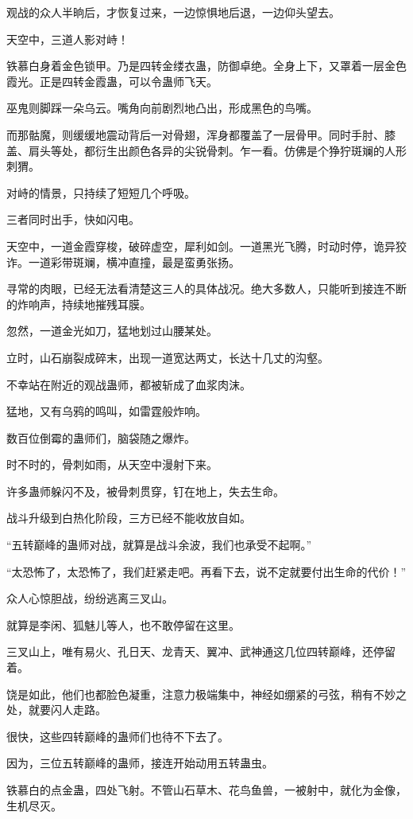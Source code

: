 \begin{this_body}
观战的众人半晌后，才恢复过来，一边惊惧地后退，一边仰头望去。

天空中，三道人影对峙！

铁慕白身着金色锁甲。乃是四转金缕衣蛊，防御卓绝。全身上下，又罩着一层金色霞光。正是四转金霞蛊，可以令蛊师飞天。

巫鬼则脚踩一朵乌云。嘴角向前剧烈地凸出，形成黑色的鸟嘴。

而那骷魔，则缓缓地震动背后一对骨翅，浑身都覆盖了一层骨甲。同时手肘、膝盖、肩头等处，都衍生出颜色各异的尖锐骨刺。乍一看。仿佛是个狰狞斑斓的人形刺猬。

对峙的情景，只持续了短短几个呼吸。

三者同时出手，快如闪电。

天空中，一道金霞穿梭，破碎虚空，犀利如剑。一道黑光飞腾，时动时停，诡异狡诈。一道彩带斑斓，横冲直撞，最是蛮勇张扬。

寻常的肉眼，已经无法看清楚这三人的具体战况。绝大多数人，只能听到接连不断的炸响声，持续地摧残耳膜。

忽然，一道金光如刀，猛地划过山腰某处。

立时，山石崩裂成碎末，出现一道宽达两丈，长达十几丈的沟壑。

不幸站在附近的观战蛊师，都被斩成了血浆肉沫。

猛地，又有乌鸦的鸣叫，如雷霆般炸响。

数百位倒霉的蛊师们，脑袋随之爆炸。

时不时的，骨刺如雨，从天空中漫射下来。

许多蛊师躲闪不及，被骨刺贯穿，钉在地上，失去生命。

战斗升级到白热化阶段，三方已经不能收放自如。

“五转巅峰的蛊师对战，就算是战斗余波，我们也承受不起啊。”

“太恐怖了，太恐怖了，我们赶紧走吧。再看下去，说不定就要付出生命的代价！”

众人心惊胆战，纷纷逃离三叉山。

就算是李闲、狐魅儿等人，也不敢停留在这里。

三叉山上，唯有易火、孔日天、龙青天、翼冲、武神通这几位四转巅峰，还停留着。

饶是如此，他们也都脸色凝重，注意力极端集中，神经如绷紧的弓弦，稍有不妙之处，就要闪人走路。

很快，这些四转巅峰的蛊师们也待不下去了。

因为，三位五转巅峰的蛊师，接连开始动用五转蛊虫。

铁慕白的点金蛊，四处飞射。不管山石草木、花鸟鱼兽，一被射中，就化为金像，生机尽灭。


\end{this_body}
